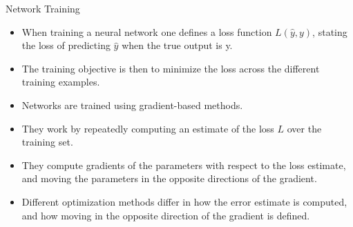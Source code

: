 \begin{frame}{Network Training}
\begin{scriptsize}
\begin{itemize}
\item  When training a neural network one defines a loss function $L(\hat{y}, y)$, stating the loss of predicting $\hat{y}$ when the true output is y.

\item The training objective is then to minimize the loss across the different training examples. 

\item Networks are trained using  gradient-based methods.

\item They work by repeatedly computing an estimate of the loss $L$ over the training set.

\item They compute gradients of the parameters with respect to the loss estimate, and moving the parameters in the opposite directions of the gradient. 

\item Different optimization methods differ in how the error estimate is computed, and how moving in the opposite direction of the gradient is defined.

\end{itemize}


\end{scriptsize}
\end{frame}




